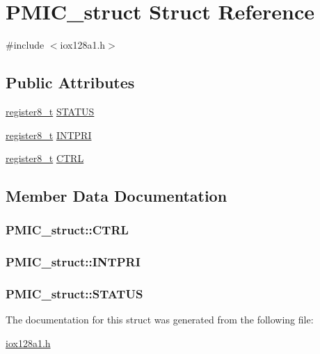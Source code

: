 \hypertarget{struct_p_m_i_c__struct}{
\section{PMIC\_\-struct Struct Reference}
\label{struct_p_m_i_c__struct}
}


{\ttfamily \#include $<$iox128a1.h$>$}

\subsection*{Public Attributes}
\begin{DoxyCompactItemize}
\item 
\hyperlink{iox128a1_8h_a6a0649252b392263406882923b04a9db}{register8\_\-t} \hyperlink{struct_p_m_i_c__struct_a809c95c128d67d374e48530a330fa097}{STATUS}
\item 
\hyperlink{iox128a1_8h_a6a0649252b392263406882923b04a9db}{register8\_\-t} \hyperlink{struct_p_m_i_c__struct_a059ee637fcfaf900d94a98534dbcb0fb}{INTPRI}
\item 
\hyperlink{iox128a1_8h_a6a0649252b392263406882923b04a9db}{register8\_\-t} \hyperlink{struct_p_m_i_c__struct_a2261480335dd680cf3808ab80b2f84f9}{CTRL}
\end{DoxyCompactItemize}


\subsection{Member Data Documentation}
\hypertarget{struct_p_m_i_c__struct_a2261480335dd680cf3808ab80b2f84f9}{
\subsubsection[{CTRL}]{ {\bf PMIC\_\-struct::CTRL}}}
\label{struct_p_m_i_c__struct_a2261480335dd680cf3808ab80b2f84f9}
\hypertarget{struct_p_m_i_c__struct_a059ee637fcfaf900d94a98534dbcb0fb}{
\subsubsection[{INTPRI}]{ {\bf PMIC\_\-struct::INTPRI}}}
\label{struct_p_m_i_c__struct_a059ee637fcfaf900d94a98534dbcb0fb}
\hypertarget{struct_p_m_i_c__struct_a809c95c128d67d374e48530a330fa097}{
\subsubsection[{STATUS}]{ {\bf PMIC\_\-struct::STATUS}}}
\label{struct_p_m_i_c__struct_a809c95c128d67d374e48530a330fa097}


The documentation for this struct was generated from the following file:\begin{DoxyCompactItemize}
\item 
\hyperlink{iox128a1_8h}{iox128a1.h}\end{DoxyCompactItemize}
